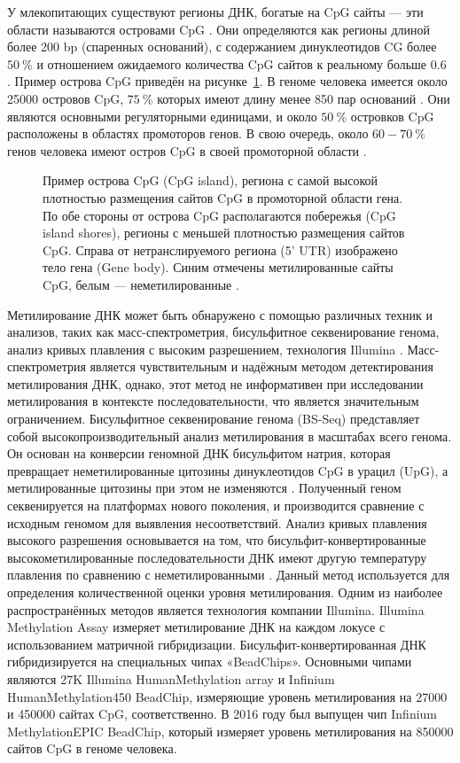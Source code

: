 У млекопитающих существуют регионы ДНК, богатые на CpG сайты --- эти области называются островами CpG \autocite{Bird1986}. Они определяются как регионы длиной более 200 bp (спаренных оснований), с содержанием динуклеотидов CG более $50~\%$ и отношением ожидаемого количества CpG сайтов к реальному больше $0.6$ \autocite{GardinerGarden1987}. Пример острова CpG приведён на рисунке~\cref{fig:CpG_Island}. В геноме человека имеется около 25000 островов CpG, $75~\%$  которых имеют длину менее 850 пар оснований \autocite{Lander2001}. Они являются основными регуляторными единицами, и около $50~\%$ островков CpG расположены в областях промоторов генов. В свою очередь, около $60-70~\%$ генов человека имеют остров CpG в своей промоторной области \autocite{Illingworth2010, Saxonov2006}.

\begin{figure}[ht]
	\caption{Пример острова CpG (CpG island), региона с самой высокой плотностью размещения сайтов CpG в промоторной области гена. По обе стороны от острова CpG располагаются побережья (CpG island shores), регионы с меньшей плотностью размещения сайтов CpG. Справа от нетранслируемого региона (5' UTR) изображено тело гена (Gene body). Синим отмечены метилированные сайты CpG, белым --- неметилированные \autocite{Fu2017}.}\label{fig:CpG_Island}
\end{figure}

Метилирование ДНК может быть обнаружено с помощью различных техник и анализов, таких как масс-спектрометрия, бисульфитное секвенирование генома, анализ кривых плавления с высоким разрешением, технология Illumina \autocite{Rana2018}. Масс-спектрометрия является чувствительным и надёжным методом детектирования метилирования ДНК, однако, этот метод не информативен при исследовании метилирования в контексте последовательности, что является значительным ограничением. Бисульфитное секвенирование генома (BS-Seq) представляет собой высокопроизводительный анализ метилирования в масштабах всего генома. Он основан на конверсии геномной ДНК бисульфитом натрия, которая превращает неметилированные цитозины динуклеотидов CpG в урацил (UpG), а метилированные цитозины при этом не изменяются \autocite{Hernandez2013}. Полученный геном секвенируется на платформах нового поколения, и производится сравнение с исходным геномом для выявления несоответствий. Анализ кривых плавления высокого разрешения основывается на том, что бисульфит-конвертированные высокометилированные последовательности ДНК имеют другую температуру плавления по сравнению с неметилированными \autocite{Malentacchi2009}. Данный метод используется для определения количественной оценки уровня метилирования. Одним из наиболее распространённых методов является технология компании Illumina. Illumina Methylation Assay измеряет метилирование ДНК на каждом локусе с использованием матричной гибридизации. Бисульфит-конвертированная ДНК гибридизируется на специальных чипах «BeadChips». Основными чипами являются 27K Illumina HumanMethylation array и Infinium HumanMethylation450 BeadChip, измеряющие уровень метилирования на 27000 и 450000 сайтах CpG, соответственно. В 2016 году был выпущен чип Infinium MethylationEPIC BeadChip, который измеряет уровень метилирования на 850000 сайтов CpG в геноме человека.

